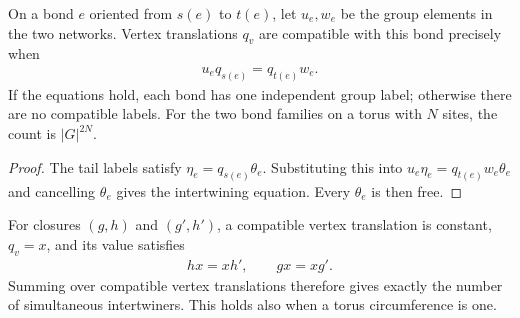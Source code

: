\begin{lemma}%
    \label{thm:peps_regular_bond_intertwining_count}
    \leanok
    On a bond $e$ oriented from $s(e)$ to $t(e)$, let $u_e,w_e$ be
    the group elements in the two networks. Vertex translations $q_v$
    are compatible with this bond precisely when
    \begin{align}
        u_e q_{s(e)}=q_{t(e)}w_e.
    \end{align}
    If the equations hold, each bond has one independent group label;
    otherwise there are no compatible labels. For the two bond families
    on a torus with $N$ sites, the count is $|G|^{2N}$.
\end{lemma}

\begin{proof}\leanok
    The tail labels satisfy $\eta_e=q_{s(e)}\theta_e$. Substituting this
    into $u_e\eta_e=q_{t(e)}w_e\theta_e$ and cancelling $\theta_e$
    gives the intertwining equation. Every $\theta_e$ is then free.
\end{proof}

\begin{lemma}%
    \label{thm:peps_torus_closure_compatibility}
    \leanok
    For closures $(g,h)$ and $(g',h')$, a compatible vertex translation
    is constant, $q_v=x$, and its value satisfies
    \begin{align}
        hx=xh',\qquad gx=xg'.
        \label{eq:peps_closure_seam_intertwining}
    \end{align}
    Summing over compatible vertex translations therefore gives exactly
    the number of simultaneous intertwiners. This holds also when a
    torus circumference is one.
\end{lemma}


